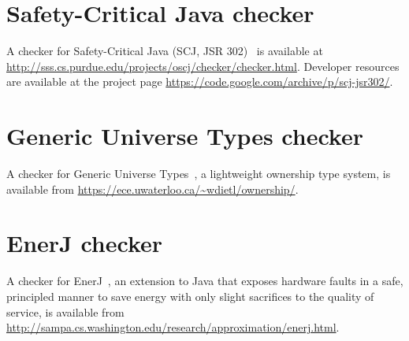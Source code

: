 




\section{Safety-Critical Java checker\label{safety-critical-java-checker}}

A checker for Safety-Critical Java (SCJ, JSR 302)~\cite{TangPJ2010} is available at
\url{http://sss.cs.purdue.edu/projects/oscj/checker/checker.html}.
Developer resources are available at the project page
\url{https://code.google.com/archive/p/scj-jsr302/}.







\section{Generic Universe Types checker\label{gut-checker}}

A checker for Generic Universe Types~\cite{DietlEM2011}, a lightweight ownership type
system, is available from
\url{https://ece.uwaterloo.ca/~wdietl/ownership/}.


\section{EnerJ checker\label{enerj-checker}}

A checker for EnerJ~\cite{SampsonDFGCG2011}, an extension to Java that exposes hardware faults
in a safe, principled manner to save energy with only
slight sacrifices to the quality of service, is available from
\url{http://sampa.cs.washington.edu/research/approximation/enerj.html}.


